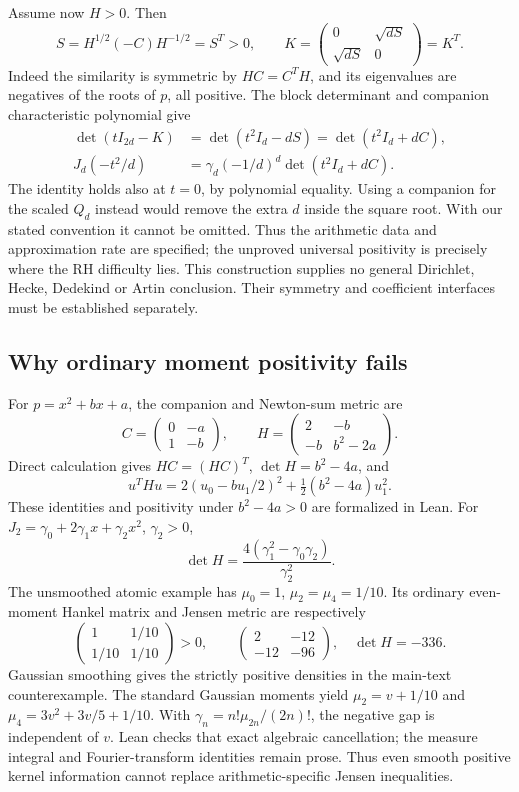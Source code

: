 Assume now $H>0$. Then
\[
 S=H^{1/2}(-C)H^{-1/2}=S^T>0,\qquad
 K=\begin{pmatrix}0&\sqrt{dS}\\\sqrt{dS}&0\end{pmatrix}=K^T.
\]
Indeed the similarity is symmetric by $HC=C^TH$, and its eigenvalues
are negatives of the roots of $p$, all positive. The block determinant
and companion characteristic polynomial give
\begin{align*}
 \det(tI_{2d}-K)&=\det(t^2I_d-dS)
                  =\det(t^2I_d+dC),\\
 J_d(-t^2/d)&=\gamma_d(-1/d)^d\det(t^2I_d+dC).
\end{align*}
The identity holds also at $t=0$, by polynomial equality.
Using a companion for the scaled $Q_d$ instead would remove the extra
$d$ inside the square root. With our stated convention it cannot be omitted.
Thus the arithmetic data and approximation rate are specified; the
unproved universal positivity is precisely where the RH difficulty lies.
This construction supplies no general Dirichlet, Hecke, Dedekind or
Artin conclusion. Their symmetry and coefficient interfaces must be
established separately.

\subsection{Why ordinary moment positivity fails}
For $p=x^2+bx+a$, the companion and Newton-sum metric are
\[
 C=\begin{pmatrix}0&-a\\1&-b\end{pmatrix},\qquad
 H=\begin{pmatrix}2&-b\\-b&b^2-2a\end{pmatrix}.
\]
Direct calculation gives $HC=(HC)^T$, $\det H=b^2-4a$, and
\[
 u^THu=2(u_0-bu_1/2)^2+\tfrac12(b^2-4a)u_1^2.
\]
These identities and positivity under $b^2-4a>0$ are formalized in Lean.
For $J_2=\gamma_0+2\gamma_1x+\gamma_2x^2$, $\gamma_2>0$,
\[
 \det H=\frac{4(\gamma_1^2-\gamma_0\gamma_2)}{\gamma_2^2}.
\]
The unsmoothed atomic example has $\mu_0=1$, $\mu_2=\mu_4=1/10$.
Its ordinary even-moment Hankel matrix and Jensen metric are respectively
\[
 \begin{pmatrix}1&1/10\\1/10&1/10\end{pmatrix}>0,\qquad
 \begin{pmatrix}2&-12\\-12&-96\end{pmatrix},\quad\det H=-336.
\]
Gaussian smoothing gives the strictly positive densities in the main-text
counterexample. The standard Gaussian moments yield
$\mu_2=v+1/10$ and $\mu_4=3v^2+3v/5+1/10$.
With $\gamma_n=n!\mu_{2n}/(2n)!$, the negative gap is independent of $v$.
Lean checks that exact algebraic cancellation; the measure integral and
Fourier-transform identities remain prose. Thus even smooth positive
kernel information cannot replace arithmetic-specific Jensen inequalities.

